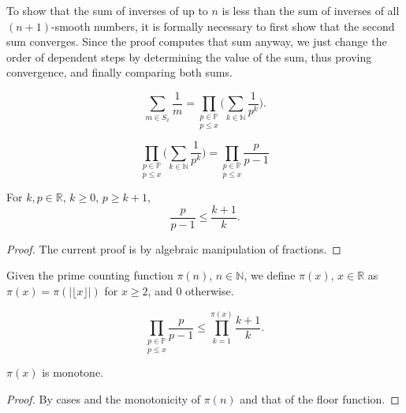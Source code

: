 To show that the sum of inverses of up to $n$ is less than the sum of inverses of all $(n+1)$-smooth
numbers, it is formally necessary to first show that the second sum converges. Since the proof computes
that sum anyway, we just change the order of dependent steps by determining the value of the sum,
thus proving convergence, and finally comparing both sums.

\begin{lemma}
\label{lem:lemma2}
\leanok
    $$\sum_{m\in S_x}\frac{1}{m} = \underset{p\le x}{\prod_{p\in\mathbb{P}}}\Big(\sum_{k\in\mathbb{N}}\frac{1}{p^k}\Big).$$
\end{lemma}

\begin{lemma}
\label{lem:lemma3}
\leanok
    $$\underset{p\le x}{\prod_{p\in\mathbb{P}}}\Big(\sum_{k\in\mathbb{N}}\frac{1}{p^k}\Big) = \underset{p\le x}{\prod_{p\in\mathbb{P}}}\frac{p}{p-1}$$
\end{lemma}

\begin{lemma}
\label{lem:lemma4-1}
\leanok
For $k,p \in\mathbb{R}$, $k\ge0$, $p \ge k+1$,
$$\frac{p}{p-1} \le \frac{k+1}{k}.$$
\end{lemma}
\begin{proof}
\leanok
The current proof is by algebraic manipulation of fractions.
\end{proof}

\begin{definition-pre}
\label{def:piReal}
Given the prime counting function $\pi(n)$, $n\in\mathbb{N}$, we define $\pi(x)$, $x\in\mathbb{R}$ as $\pi(x) = \pi(|\lfloor x\rfloor|)$ for $x\ge2$, and $0$ otherwise.
\end{definition-pre}

\begin{lemma}
\label{lem:lemma4}
$$\underset{p\le x}{\prod_{p\in\mathbb{P}}}\frac{p}{p-1} \le \prod_{k=1}^{\pi(x)}\frac{k+1}{k}.$$
\end{lemma}

\begin{lemma}
\label{lem:lemma5-2-1}
\leanok
$\pi(x)$ is monotone.
\end{lemma}
\begin{proof}
\leanok
By cases and the monotonicity of $\pi(n)$ and that of the floor function.
\end{proof}

